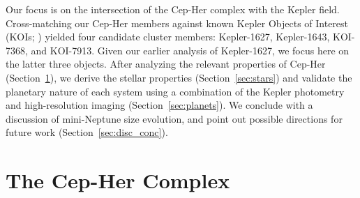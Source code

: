 \documentclass[12pt,twocolumn]{aastex63}
\begin{document}
Our focus is on the intersection of the Cep-Her complex with the
Kepler field.  Cross-matching our Cep-Her members against known Kepler
Objects of Interest (KOIs; \citealt{thompson_planetary_2018}) yielded
four candidate cluster members: Kepler-1627, Kepler-1643, KOI-7368,
and KOI-7913.  Given our earlier analysis of Kepler-1627, we focus
here on the latter three objects.  After analyzing the relevant properties of
Cep-Her (Section~\ref{sec:cluster}), we derive the stellar properties
(Section~\ref{sec:stars}) and validate the planetary nature of each
system using a combination of the Kepler photometry and
high-resolution imaging (Section~\ref{sec:planets}).  We conclude with
a discussion of mini-Neptune size evolution, and point out possible
directions for future work (Section~\ref{sec:disc_conc}).

\section{The Cep-Her Complex}
\label{sec:cluster}
\end{document}
